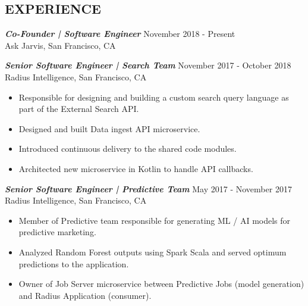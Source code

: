 \documentclass[overlapped, 10pt]{res} %
\begin{document}
\begin{resume}

 


 
\section{EXPERIENCE}\smallskip

{\sl \textbf{Co-Founder | Software Engineer}} \hfill November 2018 - Present \\
Ask Jarvis, San Francisco, CA

{\sl \textbf{Senior Software Engineer | Search Team}} \hfill November 2017 - October 2018 \\
Radius Intelligence, San Francisco, CA
\begin{itemize}
\item Responsible for designing and building a custom search query language as part of the External Search API.
\item Designed and built Data ingest API microservice.
\item Introduced continuous delivery to the shared code modules.
\item Architected new microservice in Kotlin to handle API callbacks.
\end{itemize} 

{\sl \textbf{Senior Software Engineer | Predictive Team}} \hfill May 2017 - November 2017 \\
Radius Intelligence, San Francisco, CA
\begin{itemize}
\item Member of Predictive team responsible for generating ML / AI models for predictive marketing.
\item Analyzed Random Forest outputs using Spark Scala and served optimum predictions to the application.
\item Owner of Job Server microservice between Predictive Jobs (model generation) and Radius Application (consumer).
\end{itemize} 


\end{resume}
\end{document}
